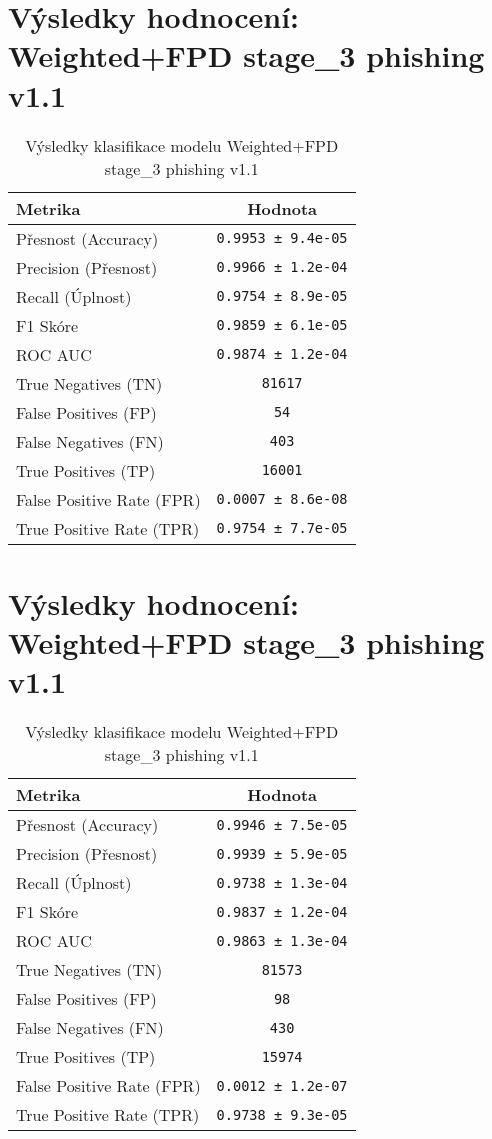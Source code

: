 \section*{Výsledky hodnocení: Weighted+FPD stage_3 phishing v1.1}
\begin{table}[h!]
\centering
\begin{tabular}{|l|c|}
\hline
\textbf{Metrika} & \textbf{Hodnota} \\
\hline
Přesnost (Accuracy) & \texttt{0.9953 ± 9.4e-05} \\
Precision (Přesnost) & \texttt{0.9966 ± 1.2e-04} \\
Recall (Úplnost) & \texttt{0.9754 ± 8.9e-05} \\
F1 Skóre & \texttt{0.9859 ± 6.1e-05} \\
ROC AUC & \texttt{0.9874 ± 1.2e-04} \\
True Negatives (TN) & \texttt{81617} \\
False Positives (FP) & \texttt{54} \\
False Negatives (FN) & \texttt{403} \\
True Positives (TP) & \texttt{16001} \\
False Positive Rate (FPR) & \texttt{0.0007 ± 8.6e-08} \\
True Positive Rate (TPR) & \texttt{0.9754 ± 7.7e-05} \\
\hline
\end{tabular}
\caption{Výsledky klasifikace modelu Weighted+FPD stage_3 phishing v1.1}
\label{tab:phishing_weighted+fpd}
\end{table}

\section*{Výsledky hodnocení: Weighted+FPD stage_3 phishing v1.1}
\begin{table}[h!]
\centering
\begin{tabular}{|l|c|}
\hline
\textbf{Metrika} & \textbf{Hodnota} \\
\hline
Přesnost (Accuracy) & \texttt{0.9946 ± 7.5e-05} \\
Precision (Přesnost) & \texttt{0.9939 ± 5.9e-05} \\
Recall (Úplnost) & \texttt{0.9738 ± 1.3e-04} \\
F1 Skóre & \texttt{0.9837 ± 1.2e-04} \\
ROC AUC & \texttt{0.9863 ± 1.3e-04} \\
True Negatives (TN) & \texttt{81573} \\
False Positives (FP) & \texttt{98} \\
False Negatives (FN) & \texttt{430} \\
True Positives (TP) & \texttt{15974} \\
False Positive Rate (FPR) & \texttt{0.0012 ± 1.2e-07} \\
True Positive Rate (TPR) & \texttt{0.9738 ± 9.3e-05} \\
\hline
\end{tabular}
\caption{Výsledky klasifikace modelu Weighted+FPD stage_3 phishing v1.1}
\label{tab:phishing_weighted+fpd}
\end{table}


